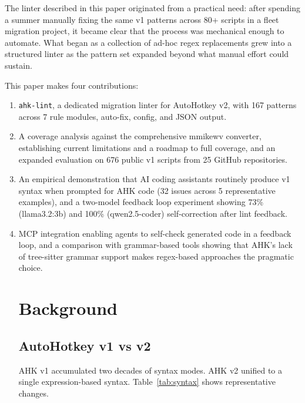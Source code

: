\documentclass[11pt,a4paper]{article}
\begin{document}
The linter described in this paper originated from a practical need: after spending a summer manually fixing the same v1 patterns across 80+ scripts in a fleet migration project, it became clear that the process was mechanical enough to automate. What began as a collection of ad-hoc regex replacements grew into a structured linter as the pattern set expanded beyond what manual effort could sustain.

This paper makes four contributions:
\begin{enumerate}
   \item \texttt{ahk-lint}, a dedicated migration linter for AutoHotkey v2, with 167 patterns across 7 rule modules, auto-fix, config, and JSON output.
  \item A coverage analysis against the comprehensive mmikewv converter, establishing current limitations and a roadmap to full coverage, and an expanded evaluation on 676 public v1 scripts from 25 GitHub repositories.
  \item An empirical demonstration that AI coding assistants routinely produce v1 syntax when prompted for AHK code (32 issues across 5 representative examples), and a two-model feedback loop experiment showing 73\% (llama3.2:3b) and 100\% (qwen2.5-coder) self-correction after lint feedback.
  \item MCP integration enabling agents to self-check generated code in a feedback loop, and a comparison with grammar-based tools showing that AHK's lack of tree-sitter grammar support makes regex-based approaches the pragmatic choice.

\section{Background}

\subsection{AutoHotkey v1 vs v2}

AHK v1 accumulated two decades of syntax modes. AHK v2 unified to a single expression-based syntax. Table~\ref{tab:syntax} shows representative changes.


\end{enumerate}
\end{document}
